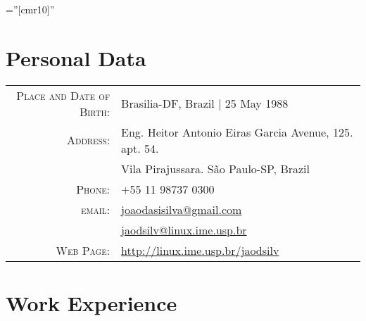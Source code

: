 \documentclass[a4paper,10pt]{article} %
\begin{document}
\pagestyle{empty} %

\font\fb=''[cmr10]'' %


\par{\bigskip\par} %

\section{Personal Data}

\begin{tabular}{rl}
\textsc{Place and Date of Birth:} & Brasilia-DF, Brazil | 25 May 1988 \\
\textsc{Address:} & Eng. Heitor Antonio Eiras Garcia Avenue, 125. apt. 54.\\& Vila Pirajussara. São Paulo-SP, Brazil \\
\textsc{Phone:} & +55 11 98737 0300\\
\textsc{email:} & \href{mailto:joaodasisilva@gmail.com}{joaodasisilva@gmail.com}\\
& \href{mailto:jaodsilv@linux.ime.usp.br}{jaodsilv@linux.ime.usp.br}\\
\textsc{Web Page:} & \href{http://linux.ime.usp.br/jaodsilv}{http://linux.ime.usp.br/jaodsilv}\\
\end{tabular}



\section{Work Experience}
\end{document}

